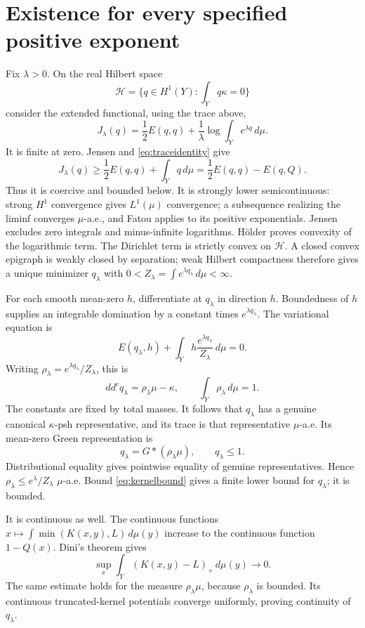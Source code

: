 \documentclass[11pt]{article}
\newcommand{\ddc}{dd^c}
\theoremstyle{remark}\newtheorem{remark}[theorem]{Remark}
\begin{document}
\section{Existence for every specified positive exponent}
Fix $\lambda>0$. On the real Hilbert space
\[
 \mathcal H=\{q\in H^1(Y):\int_Yq\kappa=0\}
\]
consider the extended functional, using the trace above,
\[
 J_\lambda(q)=\frac12E(q,q)
             +\frac1\lambda\log\int_Ye^{\lambda q}\,d\mu.
\]
It is finite at zero. Jensen and \eqref{eq:traceidentity} give
\[
 J_\lambda(q)\geq\frac12E(q,q)+\int_Yq\,d\mu
                =\frac12E(q,q)-E(q,Q).
\]
Thus it is coercive and bounded below. It is strongly lower
semicontinuous: strong $H^1$ convergence gives $L^1(\mu)$ convergence;
a subsequence realizing the liminf converges $\mu$-a.e., and Fatou
applies to its positive exponentials. Jensen excludes zero integrals
and minus-infinite logarithms. H\"older proves convexity of the
logarithmic term. The Dirichlet term is strictly convex on
$\mathcal H$. A closed convex epigraph is weakly closed by separation;
weak Hilbert compactness therefore gives a unique minimizer $q_\lambda$
with $0<Z_\lambda=\int e^{\lambda q_\lambda}\,d\mu<\infty$.

For each smooth mean-zero $h$, differentiate at $q_\lambda$ in direction
$h$. Boundedness of $h$ supplies an integrable domination by a constant
times $e^{\lambda q_\lambda}$. The variational equation is
\[
 E(q_\lambda,h)+\int_Yh\frac{e^{\lambda q_\lambda}}{Z_\lambda}\,d\mu=0.
\]
Writing $\rho_\lambda=e^{\lambda q_\lambda}/Z_\lambda$, this is
\begin{equation}\label{eq:Euler}
 \ddc q_\lambda=\rho_\lambda\mu-\kappa,\qquad
 \int_Y\rho_\lambda\,d\mu=1.
\end{equation}
The constants are fixed by total masses. It follows that $q_\lambda$
has a genuine canonical $\kappa$-psh representative, and its trace is
that representative $\mu$-a.e. Its mean-zero Green representation is
\[
 q_\lambda=G*(\rho_\lambda\mu),\qquad q_\lambda\leq1.
\]
Distributional equality gives pointwise equality of genuine
representatives. Hence
$\rho_\lambda\leq e^\lambda/Z_\lambda$ $\mu$-a.e. Bound
\eqref{eq:kernelbound} gives a finite lower bound for $q_\lambda$;
it is bounded.

It is continuous as well. The continuous functions
$x\mapsto\int\min(K(x,y),L)\,d\mu(y)$ increase to the continuous
function $1-Q(x)$. Dini's theorem gives
\begin{equation}\label{eq:tail}
 \sup_x\int_Y(K(x,y)-L)_+\,d\mu(y)\longrightarrow0.
\end{equation}
The same estimate holds for the measure $\rho_\lambda\mu$, because
$\rho_\lambda$ is bounded. Its continuous truncated-kernel potentials
converge uniformly, proving continuity of $q_\lambda$.
\end{document}
